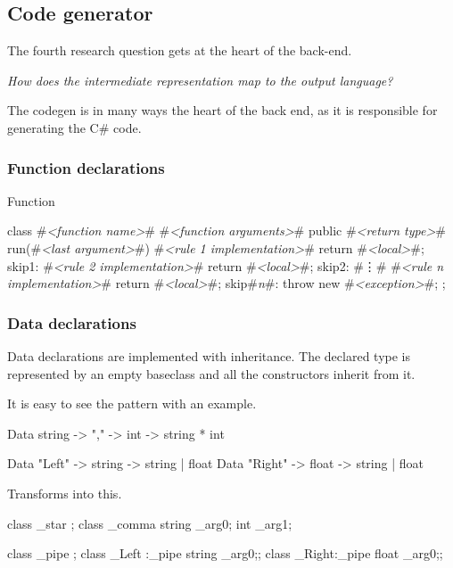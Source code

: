 \subsection{Code generator}
The fourth research question gets at the heart of the back-end.

\textit{How does the intermediate representation map to the output language?}

The codegen is in many ways the heart of the back end, as it is responsible for generating the C\# code.

\subsubsection{Function declarations}
Function

\begin{code}
class #\textit{<function name>}# {
    #\textit{<function arguments>}#
    public #\textit{<return type>}# 
    run(#\textit{<last argument>}#) {
        {
            #\textit{<rule 1 implementation>}#
            return #\textit{<local>}#;
        }
      skip1:
        {
            #\textit{<rule 2 implementation>}#
            return #\textit{<local>}#;
        }
      skip2:
        #\vdots#
        {
            #\textit{<rule n implementation>}#
            return #\textit{<local>}#;
        }
      skip#\textit{n}#:
        throw new #\textit{<exception>}#;
    }
};
\end{code}

\subsubsection{Data declarations}
Data declarations are implemented with inheritance.
The declared type is represented by an empty baseclass and all the constructors inherit from it.

It is easy to see the pattern with an example.

\begin{code}
Data string -> "," -> int -> string * int

Data "Left"  -> string -> string | float
Data "Right" -> float  -> string | float
\end{code}

Transforms into this.

\begin{code}
class _star {};
class _comma { string _arg0; int _arg1;}

class _pipe {};
class _Left :_pipe {string _arg0;};
class _Right:_pipe {float  _arg0;};
\end{code}

